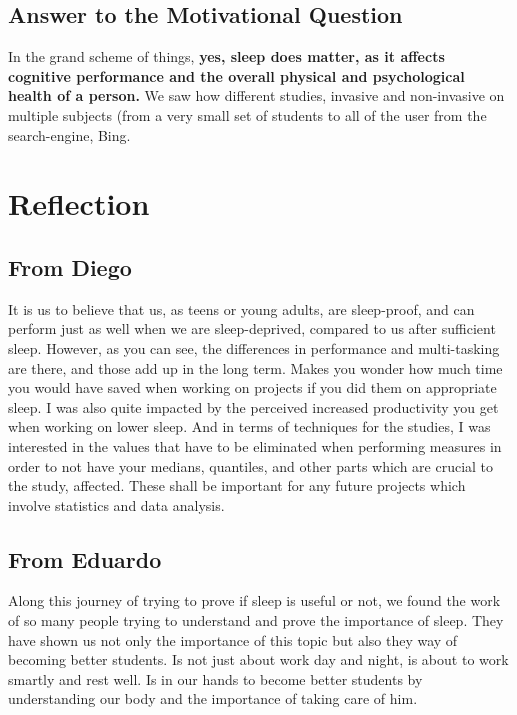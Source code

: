 \documentclass[]{IEEEtran}
\begin{document}
\subsection{Answer to the Motivational Question}

In the grand scheme of things, \textbf{yes, sleep does matter, as it affects cognitive performance and the overall physical and psychological health of a person.} We saw how different studies, invasive and non-invasive on multiple subjects (from a very small set of students to all of the user from the search-engine, Bing. 

\section{Reflection} %

\subsection{From Diego} 

It is us to believe that us, as teens or young adults, are sleep-proof, and can perform just as well when we are sleep-deprived, compared to us after sufficient sleep. However, as you can see, the differences in performance and multi-tasking are there, and those add up in the long term. Makes you wonder how much time you would have saved when working on projects if you did them on appropriate sleep. I was also quite impacted by the perceived increased productivity you get when working on lower sleep. And in terms of techniques for the studies, I was interested in the values that have to be eliminated when performing measures in order to not have your medians, quantiles, and other parts which are crucial to the study, affected. These shall be important for any future projects which involve statistics and data analysis.

\subsection{From Eduardo}

Along this journey of trying to prove if sleep is useful or not, we found the work of so many people trying to understand and prove the importance of sleep. They have shown us not only the importance of this topic but also they way of becoming better students. Is not just about work day and night, is about to work smartly and rest well. Is in our hands to become better students by understanding our body and the importance of taking care of him.
\end{document}
